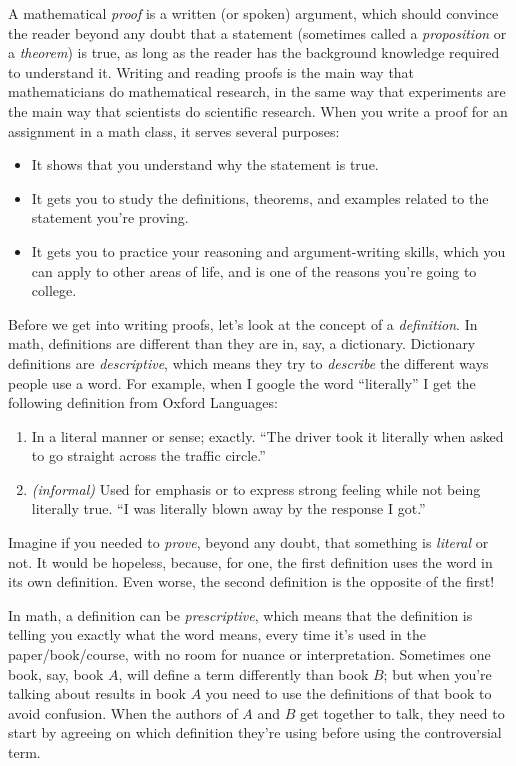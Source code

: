\documentclass[11pt, letterpaper]{report}
\newcounter{example}[section]
\newcounter{theorem}[chapter]
\begin{document}
A mathematical \emph{proof} is a written (or spoken) argument, which should convince the reader beyond any doubt that a statement (sometimes called a \emph{proposition} or a \emph{theorem}) is true, as long as the reader has the background knowledge required to understand it. Writing and reading proofs is the main way that mathematicians do mathematical research, in the same way that experiments are the main way that scientists do scientific research. When you write a proof for an assignment in a math class, it serves several purposes:
\begin{itemize}
\item It shows that you understand why the statement is true.
\item It gets you to study the definitions, theorems, and examples related to the statement you're proving.
\item It gets you to practice your reasoning and argument-writing skills, which you can apply to other areas of life, and is one of the reasons you're going to college.
\end{itemize}
Before we get into writing proofs, let's look at the concept of a \emph{definition}. In math, definitions are different than they are in, say, a dictionary. Dictionary definitions are \emph{descriptive}, which means they try to \emph{describe} the different ways people use a word. For example, when I google the word ``literally'' I get the following definition from Oxford Languages:
\begin{enumerate}
\item In a literal manner or sense; exactly. ``The driver took it literally when asked to go straight across the traffic circle.''
\item \emph{(informal)} Used for emphasis or to express strong feeling while not being literally true. ``I was literally blown away by the response I got.''
\end{enumerate}
Imagine if you needed to \emph{prove}, beyond any doubt, that something is \emph{literal} or not. It would be hopeless, because, for one, the first definition uses the word in its own definition. Even worse, the second definition is the opposite of the first! 

In math, a definition can be \emph{prescriptive}, which means that the definition is telling you exactly what the word means, every time it's used in the paper/book/course, with no room for nuance or interpretation. Sometimes one book, say, book $A$, will define a term differently than book $B$; but when you're talking about results in book $A$ you need to use the definitions of that book to avoid confusion. When the authors of $A$ and $B$ get together to talk, they need to start by agreeing on which definition they're using before using the controversial term.
\end{document}
